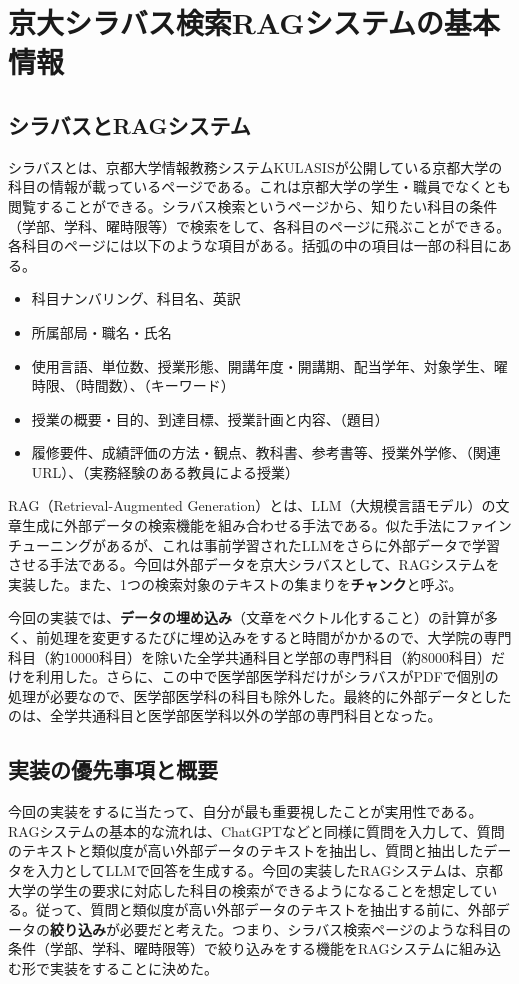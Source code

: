 \section{京大シラバス検索RAGシステムの基本情報}
\subsection{シラバスとRAGシステム}
シラバスとは、京都大学情報教務システムKULASISが公開している京都大学の科目の情報が載っているページである\cite{kulasis}。これは京都大学の学生・職員でなくとも閲覧することができる。シラバス検索というページから、知りたい科目の条件（学部、学科、曜時限等）で検索をして、各科目のページに飛ぶことができる。各科目のページには以下のような項目がある。括弧の中の項目は一部の科目にある。

\begin{itemize}
  \item 科目ナンバリング、科目名、英訳
  \item 所属部局・職名・氏名
  \item 使用言語、単位数、授業形態、開講年度・開講期、配当学年、対象学生、曜時限、（時間数）、（キーワード）
  \item 授業の概要・目的、到達目標、授業計画と内容、（題目）
  \item 履修要件、成績評価の方法・観点、教科書、参考書等、授業外学修、（関連URL）、（実務経験のある教員による授業）
\end{itemize}

RAG（Retrieval-Augmented Generation）とは、LLM（大規模言語モデル）の文章生成に外部データの検索機能を組み合わせる手法である。似た手法にファインチューニングがあるが、これは事前学習されたLLMをさらに外部データで学習させる手法である。今回は外部データを京大シラバスとして、RAGシステムを実装した。また、1つの検索対象のテキストの集まりを\textbf{チャンク}と呼ぶ。

今回の実装では、\textbf{データの埋め込み}（文章をベクトル化すること）の計算が多く、前処理を変更するたびに埋め込みをすると時間がかかるので、大学院の専門科目（約10000科目）を除いた全学共通科目と学部の専門科目（約8000科目）だけを利用した。さらに、この中で医学部医学科だけがシラバスがPDFで個別の処理が必要なので、医学部医学科の科目も除外した。最終的に外部データとしたのは、全学共通科目と医学部医学科以外の学部の専門科目となった。

\subsection{実装の優先事項と概要}
今回の実装をするに当たって、自分が最も重要視したことが実用性である。RAGシステムの基本的な流れは、ChatGPTなどと同様に質問を入力して、質問のテキストと類似度が高い外部データのテキストを抽出し、質問と抽出したデータを入力としてLLMで回答を生成する。今回の実装したRAGシステムは、京都大学の学生の要求に対応した科目の検索ができるようになることを想定している。従って、質問と類似度が高い外部データのテキストを抽出する前に、外部データの\textbf{絞り込み}が必要だと考えた。つまり、シラバス検索ページのような科目の条件（学部、学科、曜時限等）で絞り込みをする機能をRAGシステムに組み込む形で実装をすることに決めた。

